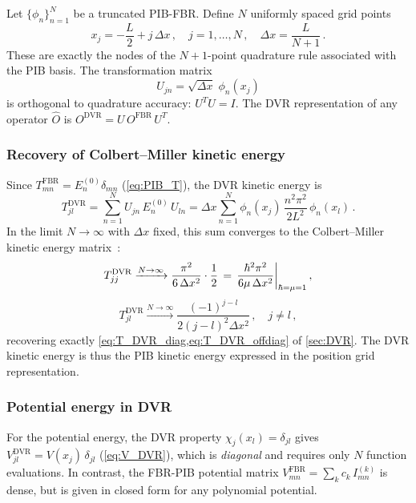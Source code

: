 Let $\{\phi_n\}_{n=1}^N$ be a truncated PIB-FBR.  Define $N$ uniformly spaced
grid points
\begin{equation}
  x_j = -\frac{L}{2} + j\,\Delta x\,,\quad j = 1, \ldots, N\,,\quad
  \Delta x = \frac{L}{N+1}\,.
\end{equation}
These are exactly the nodes of the $N+1$-point quadrature rule associated with
the PIB basis.  The transformation matrix
\begin{equation}\label{eq:PIB_U}
  U_{jn} = \sqrt{\Delta x}\;\phi_n(x_j)
\end{equation}
is orthogonal to quadrature accuracy: $U^T U = I$.  The DVR representation of
any operator $\hat{O}$ is $O^{\text{DVR}} = U\,O^{\text{FBR}}\,U^T$.

\subsubsection{Recovery of Colbert--Miller kinetic energy}

Since $T^{\text{FBR}}_{mn} = E_n^{(0)}\delta_{mn}$ (\cref{eq:PIB_T}), the
DVR kinetic energy is
\begin{equation}
  T^{\text{DVR}}_{jl}
  = \sum_{n=1}^{N} U_{jn}\,E_n^{(0)}\,U_{ln}
  = \Delta x\sum_{n=1}^{N}\phi_n(x_j)\,\frac{n^2\pi^2}{2L^2}\,\phi_n(x_l)\,.
\end{equation}
In the limit $N \to \infty$ with $\Delta x$ fixed, this sum converges to the
Colbert--Miller kinetic energy matrix~\cite{ColbertMiller1992}:
\begin{equation}
  T^{\text{DVR}}_{jj} \xrightarrow{N\to\infty}
  \frac{\pi^2}{6\,\Delta x^2}\cdot\frac{1}{2} \,=\,
  \frac{\hbar^2\pi^2}{6\mu\,\Delta x^2}\bigg|_{\hbar=\mu=1}\,,
\end{equation}
\begin{equation}
  T^{\text{DVR}}_{jl} \xrightarrow{N\to\infty}
  \frac{(-1)^{j-l}}{2(j-l)^2\Delta x^2}\,,\quad j\neq l\,,
\end{equation}
recovering exactly \cref{eq:T_DVR_diag,eq:T_DVR_offdiag} of \cref{sec:DVR}.
The DVR kinetic energy is thus the PIB kinetic energy expressed in the position
grid representation.

\subsubsection{Potential energy in DVR}

For the potential energy, the DVR property $\chi_j(x_l) = \delta_{jl}$ gives
$V^{\text{DVR}}_{jl} = V(x_j)\,\delta_{jl}$ (\cref{eq:V_DVR}), which is
\emph{diagonal} and requires only $N$ function evaluations.  In contrast, the
FBR-PIB potential matrix $V_{mn}^{\text{FBR}} = \sum_k c_k\,I_{mn}^{(k)}$ is
dense, but is given in closed form for any polynomial potential.

